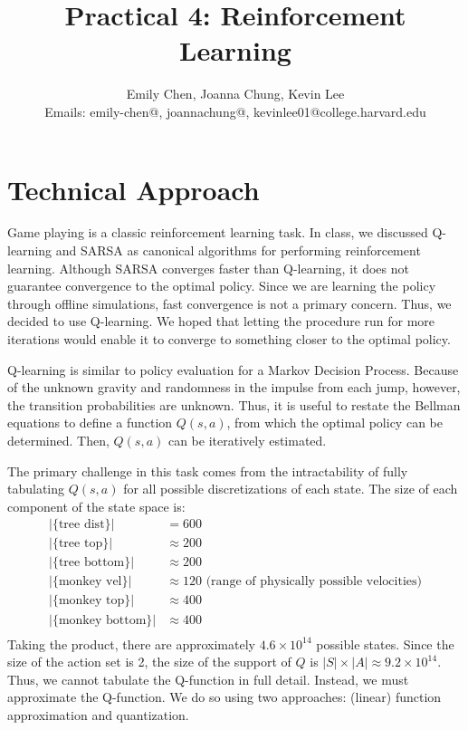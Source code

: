 \documentclass[11pt]{article}
\title{Practical 4: Reinforcement Learning}
\author{Emily Chen, Joanna Chung, Kevin Lee \\
Emails: emily-chen@, joannachung@, kevinlee01@college.harvard.edu}
\begin{document}
\maketitle{}

\section{Technical Approach}

Game playing is a classic reinforcement learning task. In class, we discussed Q-learning and SARSA as canonical algorithms for performing reinforcement learning. Although SARSA converges faster than Q-learning, it does not guarantee convergence to the optimal policy. Since we are learning the policy through offline simulations, fast convergence is not a primary concern. Thus, we decided to use Q-learning. We hoped that letting the procedure run for more iterations would enable it to converge to something closer to the optimal policy.

Q-learning is similar to policy evaluation for a Markov Decision Process. Because of the unknown gravity and randomness in the impulse from each jump, however,  the transition probabilities are unknown. Thus, it is useful to restate the Bellman equations to define a function $Q(s,a)$, from which the optimal policy can be determined. Then, $Q(s,a)$ can be iteratively estimated.

The primary challenge in this task comes from the intractability of fully tabulating $Q(s,a)$ for all possible discretizations of each state. The size of each component of the state space is:
\begin{align*}
    | \{\text{tree dist}\}| &= 600 \\ 
    | \{\text{tree top}\}| &\approx 200 \\ 
    | \{\text{tree bottom}\}| &\approx 200 \\ 
    | \{\text{monkey vel}\}| &\approx 120 \text{ (range of physically possible velocities)} \\ 
    | \{\text{monkey top}\}| &\approx 400 \\ 
    | \{\text{monkey bottom}\}| &\approx 400 \\ 
\end{align*}
Taking the product, there are approximately $4.6 \times 10^{14}$ possible states. Since the size of the action set is 2, the size of the support of $Q$ is $|S| \times |A| \approx 9.2 \times 10^{14}$. Thus, we cannot tabulate the Q-function in full detail. Instead, we must approximate the Q-function. We do so using two approaches: (linear) function approximation and quantization.
\end{document}
